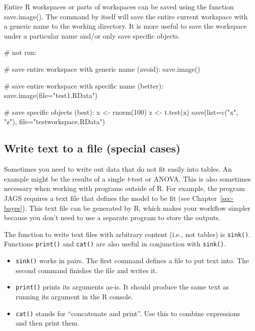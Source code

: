 \documentclass[
  13,
  letterpaper,
]{report}
\newenvironment{Shaded}{\begin{snugshade}}{\end{snugshade}}
\newcommand{\AttributeTok}[1]{\textcolor[rgb]{0.40,0.45,0.13}{#1}}
\newcommand{\CommentTok}[1]{\textcolor[rgb]{0.37,0.37,0.37}{#1}}
\newcommand{\DecValTok}[1]{\textcolor[rgb]{0.68,0.00,0.00}{#1}}
\newcommand{\FunctionTok}[1]{\textcolor[rgb]{0.28,0.35,0.67}{#1}}
\newcommand{\NormalTok}[1]{\textcolor[rgb]{0.00,0.23,0.31}{#1}}
\newcommand{\OtherTok}[1]{\textcolor[rgb]{0.00,0.23,0.31}{#1}}
\newcommand{\StringTok}[1]{\textcolor[rgb]{0.13,0.47,0.30}{#1}}
\begin{document}
Entire R workspaces or parts of workspaces can be saved using the
function save.image(). The command by itself will save the entire
current workspace with a generic name to the working directory. It is
more useful to save the workspace under a particular name and/or only
save specific objects.

\begin{Shaded}
\begin{Highlighting}[]
\CommentTok{\# not run:}

\CommentTok{\# save entire workspace with generic name (avoid):}
\FunctionTok{save.image}\NormalTok{()}

\CommentTok{\# save entire workspace with specific name (better):}
\FunctionTok{save.image}\NormalTok{(}\AttributeTok{file=}\StringTok{"test1.RData"}\NormalTok{)}

\CommentTok{\# save specific objects (best):}
\NormalTok{x }\OtherTok{\textless{}{-}} \FunctionTok{rnorm}\NormalTok{(}\DecValTok{100}\NormalTok{)}
\NormalTok{z }\OtherTok{\textless{}{-}} \FunctionTok{t.test}\NormalTok{(x)}
\FunctionTok{save}\NormalTok{(}\AttributeTok{list=}\FunctionTok{c}\NormalTok{(}\StringTok{"x"}\NormalTok{, }\StringTok{"z"}\NormalTok{), }\AttributeTok{file=}\StringTok{"testworkspace.RData"}\NormalTok{)}
\end{Highlighting}
\end{Shaded}

\subsection{Write text to a file (special
cases)}\label{sec-ie-export-sink}

Sometimes you need to write out data that do not fit easily into tables.
An example might be the results of a single \emph{t}-test or ANOVA. This
is also sometimes necessary when working with programs outside of R. For
example, the program JAGS requires a text file that defines the model to
be fit (see Chapter~\ref{sec-bayes}). This text file can be generated by
R, which makes your workflow simpler because you don't need to use a
separate program to store the outputs.

The function to write text files with arbitrary content (i.e., not
tables) is \texttt{sink()}. Functions \texttt{print()} and
\texttt{cat()} are also useful in conjunction with \texttt{sink()}.

\begin{itemize}
\item
  \texttt{sink()} works in pairs. The first command defines a file to
  put text into. The second command finishes the file and writes it.
\item
  \texttt{print()} prints its arguments as-is. It should produce the
  same text as running its argument in the R console.
\item
  \texttt{cat()} stands for ``concatenate and print''. Use this to
  combine expressions and then print them.
\end{itemize}
\end{document}
